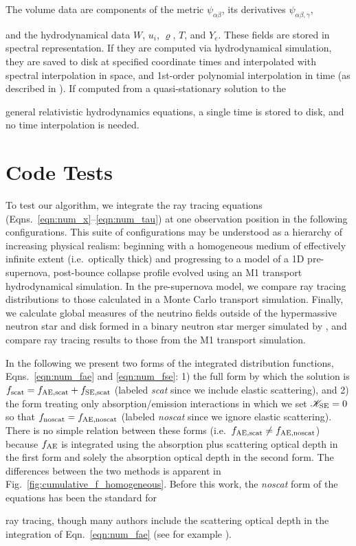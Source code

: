 \documentclass[aps,floatfix,prd,superscriptaddress,twocolumn]{revtex4-1}
\newcommand{\todo}[1]{\marginpar{\tiny{\textcolor{red}{#1}}}}
\renewcommand\todo[1]{} %
\begin{document}
The volume data are components of the metric $\psi_{\alpha\beta}$,
its derivatives $\psi_{\alpha\beta,\gamma}$,
\todo{state num independent components}
and the hydrodynamical data $W$, $u_i$, $\varrho$, $T$, and $Y_e$.
These fields are stored in spectral representation.
If they are computed via hydrodynamical simulation, they are saved to disk
at specified coordinate times and interpolated
with spectral interpolation in space,
and 1st-order polynomial interpolation in time
(as described in \cite[App.~B]{bohn2016-code}).
If computed from a quasi-stationary solution to the
\todo{clarify quasistationary timescale}
general relativistic hydrodynamics equations,
a single time is stored to disk, and no time interpolation is needed.

\section{Code Tests}
\label{sec:tests}

To test our algorithm, we integrate the ray tracing equations
(Eqns.~\ref{eqn:num_x}--\ref{eqn:num_tau}) at one observation position
in the following configurations. This suite of configurations
may be understood as a hierarchy of increasing physical realism:
beginning with a homogeneous medium of effectively
infinite extent (i.e.\ optically thick) and progressing to a model of a
1D pre-supernova, post-bounce collapse profile
evolved using an M1 transport hydrodynamical simulation.
In the pre-supernova model, we compare ray tracing distributions
to those calculated in a Monte Carlo transport simulation.
Finally, we calculate global measures of the neutrino fields outside of the
hypermassive neutron star and disk formed in a binary neutron star
merger simulated by \cite{fouc2016-m1_nsns, fouc2016-m1_evolve_n},
and compare ray tracing results to those from the M1 transport simulation.

In the following we present two forms of the integrated distribution functions,
Eqns.~\ref{eqn:num_fae} and \ref{eqn:num_fse}:
1) the full form  by which the solution is $f_{\rm scat}=f_{\rm AE,scat}+f_{\rm SE,scat}$
(labeled \emph{scat} since we include elastic scattering), and
2) the form treating only absorption/emission interactions
in which we set $\mathscr{K}_{\rm SE}=0$ so that $f_{\rm noscat}=f_{\rm AE,noscat}$
(labeled \emph{noscat} since we ignore elastic scattering).
There is no simple relation between these forms
(i.e.\ $f_{\rm AE,scat} \neq f_{\rm AE,noscat}$)
because $f_{\rm AE}$ is integrated using the absorption plus scattering optical depth
in the first form and solely the absorption optical depth in the second form.
The differences between the two methods is apparent
in Fig.~\ref{fig:cumulative_f_homogeneous}.
Before this work, the \emph{noscat} form of the equations has been the standard for
\todo{explain why; cite others}
ray tracing, though many authors include the scattering optical depth in
the integration of Eqn.~\ref{eqn:num_fae}
(see for example \cite{hari2010-gr_nunubar_collapsar}).
\end{document}
